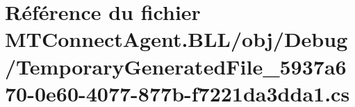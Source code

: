 \hypertarget{_m_t_connect_agent_8_b_l_l_2obj_2_debug_2_temporary_generated_file__5937a670-0e60-4077-877b-f7221da3dda1_8cs}{}\section{Référence du fichier M\+T\+Connect\+Agent.\+B\+LL/obj/\+Debug/\+Temporary\+Generated\+File\+\_\+5937a670-\/0e60-\/4077-\/877b-\/f7221da3dda1.cs}
\label{_m_t_connect_agent_8_b_l_l_2obj_2_debug_2_temporary_generated_file__5937a670-0e60-4077-877b-f7221da3dda1_8cs}
